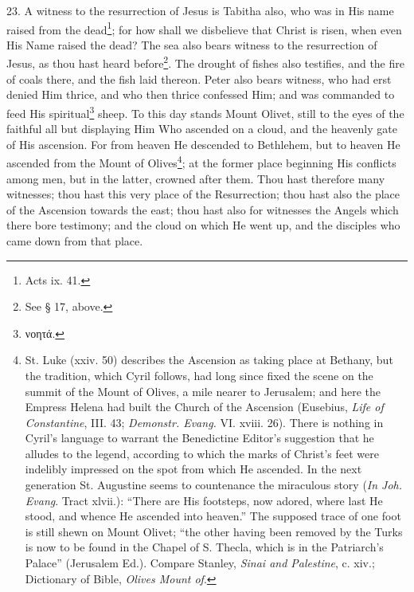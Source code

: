 23. A witness to the resurrection of Jesus is Tabitha also, who was in His name raised from the dead\footnote{Acts ix. 41.}; for how shall we disbelieve that Christ is risen, when even His Name raised the dead? The sea also bears witness to the resurrection of Jesus, as thou hast heard before\footnote{See § 17, above.}. The drought of fishes also testifies, and the fire of coals there, and the fish laid thereon. Peter also bears witness, who had erst denied Him thrice, and who then thrice confessed Him; and was commanded to feed His spiritual\footnote{\textgreek{νοητά}.} sheep. To this day stands Mount Olivet, still to the eyes of the faithful all but displaying Him Who ascended on a cloud, and the heavenly gate of His ascension. For from heaven He descended to Bethlehem, but to heaven He ascended from the Mount of Olives\footnote{St. Luke (xxiv. 50) describes the Ascension as taking place at Bethany, but the tradition, which Cyril follows, had long since fixed the scene on the summit of the Mount of Olives, a mile nearer to Jerusalem; and here the Empress Helena had built the Church of the Ascension (Eusebius, \emph{Life of Constantine}, III. 43; \emph{Demonstr. Evang.} VI. xviii. 26). There is nothing in Cyril’s language to warrant the Benedictine Editor’s suggestion that he alludes to the legend, according to which the marks of Christ’s feet were indelibly impressed on the spot from which He ascended. In the next generation St. Augustine seems to countenance the miraculous story (\emph{In Joh. Evang}. Tract xlvii.): “There are His footsteps, now adored, where last He stood, and whence He ascended into heaven.” The supposed trace of one foot is still shewn on Mount Olivet; “the other having been removed by the Turks is now to be found in the Chapel of S. Thecla, which is in the Patriarch’s Palace” (Jerusalem Ed.). Compare Stanley, \emph{Sinai and Palestine}, c. xiv.; Dictionary of Bible, \emph{Olives Mount of}.}; at the former place beginning His conflicts among men, but in the latter, crowned after them. Thou hast therefore many witnesses; thou hast this very place of the Resurrection; thou hast also the place of the Ascension towards the east; thou hast also for witnesses the Angels which there bore testimony; and the cloud on which He went up, and the disciples who came down from that place.

